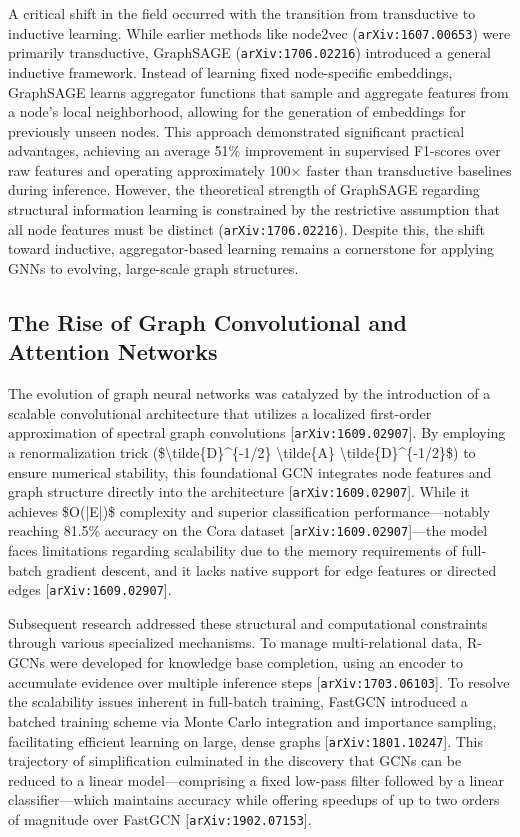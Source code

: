 \documentclass[11pt]{article}
\begin{document}
A critical shift in the field occurred with the transition from transductive to inductive learning. While earlier methods like node2vec (\texttt{arXiv:1607.00653}) were primarily transductive, GraphSAGE (\texttt{arXiv:1706.02216}) introduced a general inductive framework. Instead of learning fixed node-specific embeddings, GraphSAGE learns aggregator functions that sample and aggregate features from a node's local neighborhood, allowing for the generation of embeddings for previously unseen nodes. This approach demonstrated significant practical advantages, achieving an average 51\% improvement in supervised F1-scores over raw features and operating approximately 100× faster than transductive baselines during inference. However, the theoretical strength of GraphSAGE regarding structural information learning is constrained by the restrictive assumption that all node features must be distinct (\texttt{arXiv:1706.02216}). Despite this, the shift toward inductive, aggregator-based learning remains a cornerstone for applying GNNs to evolving, large-scale graph structures.

\subsection{The Rise of Graph Convolutional and Attention Networks}

The evolution of graph neural networks was catalyzed by the introduction of a scalable convolutional architecture that utilizes a localized first-order approximation of spectral graph convolutions [\texttt{arXiv:1609.02907}]. By employing a renormalization trick (\$\textbackslash{}tilde\{D\}\textasciicircum{}\{-1/2\} \textbackslash{}tilde\{A\} \textbackslash{}tilde\{D\}\textasciicircum{}\{-1/2\}\$) to ensure numerical stability, this foundational GCN integrates node features and graph structure directly into the architecture [\texttt{arXiv:1609.02907}]. While it achieves \$O(|E|)\$ complexity and superior classification performance—notably reaching 81.5\% accuracy on the Cora dataset [\texttt{arXiv:1609.02907}]—the model faces limitations regarding scalability due to the memory requirements of full-batch gradient descent, and it lacks native support for edge features or directed edges [\texttt{arXiv:1609.02907}].

Subsequent research addressed these structural and computational constraints through various specialized mechanisms. To manage multi-relational data, R-GCNs were developed for knowledge base completion, using an encoder to accumulate evidence over multiple inference steps [\texttt{arXiv:1703.06103}]. To resolve the scalability issues inherent in full-batch training, FastGCN introduced a batched training scheme via Monte Carlo integration and importance sampling, facilitating efficient learning on large, dense graphs [\texttt{arXiv:1801.10247}]. This trajectory of simplification culminated in the discovery that GCNs can be reduced to a linear model—comprising a fixed low-pass filter followed by a linear classifier—which maintains accuracy while offering speedups of up to two orders of magnitude over FastGCN [\texttt{arXiv:1902.07153}].
\end{document}
